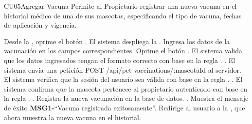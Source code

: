 \begin{UseCase}{CU05}{Agregar Vacuna}{
      Permite al Propietario registrar una nueva vacuna en el historial médico de una de sus mascotas, especificando el tipo de vacuna, fechas de aplicación
  y vigencia.
  }
  \end{UseCase}
  \begin{UCtrayectoria}
      \UCpaso[\UCactor] Desde la , oprime el botón .
      \UCpaso El sistema despliega la .
      \UCpaso[\UCactor] Ingresa los datos de la vacunación en los campos correspondientes. \label{CU05-FillForm}
      \UCpaso[\UCactor] Oprime el botón . \label{CU05-Submit}
      \UCpaso El sistema valida que los datos ingresados tengan el formato correcto con base en la regla . .
      \UCpaso El sistema envía una petición POST /api/pet-vaccinations/:mascotaId al servidor.
      \UCpaso El sistema verifica que la sesión del usuario sea válida con base en la regla . .
      \UCpaso El sistema confirma que la mascota pertenece al propietario autenticado con base en la regla . .
      \UCpaso Registra la nueva vacunación en la base de datos. .
      \UCpaso Muestra el mensaje de éxito {\bf MSG1-}``Vacuna registrada exitosamente''.
      \UCpaso Redirige al usuario a la , que ahora muestra la nueva vacuna en el historial.
  \end{UCtrayectoria}
  
  
